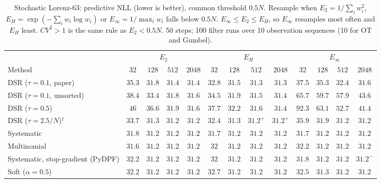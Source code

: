 \begin{table}[ht]
\centering
\small
\caption{Stochastic Lorenz-63: predictive NLL (lower is better), common threshold $0.5N$. Resample when $E_2=1/\sum_iw_i^2$, $E_H=\exp(-\sum_iw_i\log w_i)$ or $E_\infty=1/\max_iw_i$ falls below $0.5N$. $E_\infty\le E_2\le E_H$, so $E_\infty$ resamples most often and $E_H$ least. $CV^2>1$ is the same rule as $E_2<0.5N$. 50 steps; 100 filter runs over 10 observation sequences (10 for OT and Gumbel).}
\label{tab:trigger-fixed-lorenz63-predictive_nll}
\begin{adjustbox}{max width=\linewidth}
\begin{tabular}{lcccc|cccc|cccc}
\toprule
 & \multicolumn{4}{c}{$E_2$} & \multicolumn{4}{c}{$E_H$} & \multicolumn{4}{c}{$E_\infty$} \\
\cmidrule(lr){2-5} \cmidrule(lr){6-9} \cmidrule(lr){10-13}
Method & $32$ & $128$ & $512$ & $2048$ & $32$ & $128$ & $512$ & $2048$ & $32$ & $128$ & $512$ & $2048$ \\
\midrule
DSR ($\tau{=}0.1$, paper) & $35.3$ & $31.8$ & $31.4$ & $31.4$ & $\mathbf{32.8}$ & $\mathbf{31.5}$ & $\mathbf{31.3}$ & $\mathbf{31.3}$ & $37.5$ & $35.3$ & $32.4$ & $31.6$ \\
DSR ($\tau{=}0.1$, unsorted) & $38.4$ & $33.4$ & $31.8$ & $31.6$ & $\mathbf{34.5}$ & $\mathbf{31.9}$ & $\mathbf{31.5}$ & $\mathbf{31.4}$ & $65.7$ & $59.7$ & $57.9$ & $43.6$ \\
DSR ($\tau{=}0.5$) & $46$ & $36.6$ & $31.9$ & $31.6$ & $\mathbf{37.7}$ & $\mathbf{32.2}$ & $\mathbf{31.6}$ & $\mathbf{31.4}$ & $92.3$ & $63.1$ & $52.7$ & $41.4$ \\
DSR ($\tau{=}2.5/N$)$^\dagger$ & $33.7$ & $31.3$ & $31.2$ & $31.2$ & $\mathbf{32.4}$ & $\mathbf{31.3}$ & $\mathbf{31.2}^{+}$ & $\mathbf{31.2}^{+}$ & $35.9$ & $31.9$ & $31.2$ & $31.2$ \\
\midrule
Systematic & $31.8$ & $31.2$ & $\mathbf{31.2}$ & $31.2$ & $31.7$ & $31.2$ & $31.2$ & $\mathbf{31.2}$ & $\mathbf{31.7}$ & $\mathbf{31.2}$ & $31.2$ & $31.2$ \\
Multinomial & $\mathbf{31.6}$ & $31.2$ & $31.2$ & $\mathbf{31.2}$ & $32$ & $31.2$ & $31.2$ & $31.2$ & $32.2$ & $\mathbf{31.2}$ & $\mathbf{31.2}$ & $31.2$ \\
Systematic, stop-gradient (PyDPF) & $32.2$ & $31.2$ & $31.2$ & $\mathbf{31.2}$ & $32$ & $31.2$ & $\mathbf{31.2}$ & $31.2$ & $\mathbf{31.8}$ & $\mathbf{31.2}$ & $31.2$ & $31.2^{-}$ \\
Soft ($\alpha{=}0.5$) & $\mathbf{32.2}$ & $\mathbf{31.2}$ & $\mathbf{31.2}$ & $\mathbf{31.2}$ & $32.7$ & $31.2$ & $31.2$ & $\mathbf{31.2}$ & $32.5$ & $31.3$ & $\mathbf{31.2}$ & $31.2$ \\

\end{tabular}
\end{adjustbox}
\end{table}
